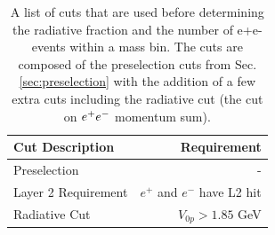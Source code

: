 

\begin{table}[!hb] 
    \centering
    \begin{tabular}{lr}
        \toprule
        \textbf{Cut Description} & \textbf{Requirement} \\
        \midrule
        Preselection & - \\
        Layer 2 Requirement & $e^+$ and $e^-$ have L2 hit \\
        Radiative Cut & $V_{0p} > 1.85$ GeV \\
        \bottomrule
    \end{tabular}
    \caption{A list of cuts that are used before determining the radiative fraction and the number of e+e- events within a mass bin. The cuts are composed of the preselection cuts from Sec. \ref{sec:preselection} with the addition of a few extra cuts including the radiative cut (the cut on $e^{+}e^{-}$ momentum sum).}
    \label{tab:radfrac}
\end{table}

